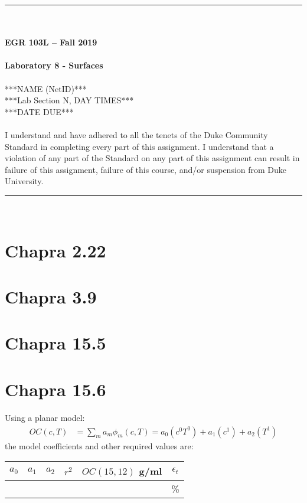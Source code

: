 \documentclass{article}
\begin{document}
\begin{center}
\rule{6.5in}{0.5mm}\\~\\
\textbf{\large EGR 103L -- Fall 2019}\\~\\
\textbf{\huge Laboratory 8 - Surfaces}\\~\\
***NAME (NetID)***\\
***Lab Section N, DAY TIMES***\\
***DATE DUE***\\~\\
{\small I understand and have adhered to all the tenets of the Duke
  Community Standard in completing every part of this assignment.  I
  understand that a violation of any part of the Standard on any part
  of this assignment can result in failure of this assignment, failure
  of this course, and/or suspension from Duke University.} 
\rule{6.5in}{0.5mm}\\
\end{center}
\tableofcontents
\listoffigures
\renewcommand{\arraystretch}{1.5}
\clearpage

\section{Chapra 2.22}

\section{Chapra 3.9}

\section{Chapra 15.5}

\section{Chapra 15.6}
Using a planar model:
\begin{align*}
\hat{OC}(c, T)&=\sum_ma_m\phi_m(c,T)=a_0(c^0T^0)+a_1(c^1)+a_2(T^1)
\end{align*}
the model coefficients and other required values are:
\begin{center}
\begin{tabular}{c|c|c|c|c|c}
$a_0$ & $a_1$ & $a_2$ & $r^2$ & $OC(15, 12)$ g/ml & $\epsilon_t$ \\ \hline
      &       &      &       &                   &  \%
\end{tabular}
\end{center}
\end{document}
